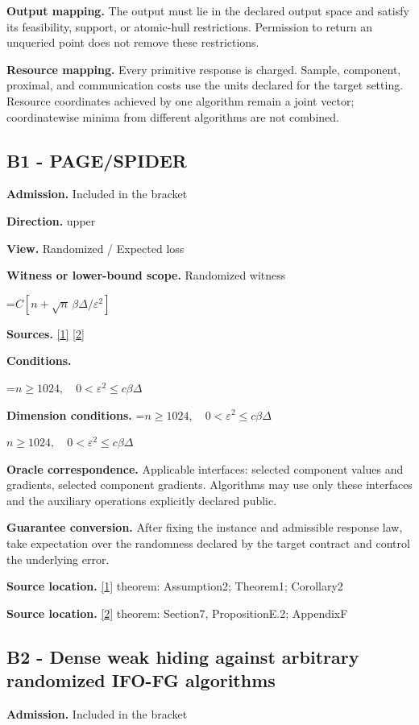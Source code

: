 \documentclass[10pt,a4paper]{article}
\newcommand{\AtlasMath}[1]{\par\begingroup\centering\setbox0=\hbox{$\displaystyle #1$}\ifdim\wd0>1.4\linewidth\typeout{ATLAS WIDE FORMULA: \the\wd0}\fi\ifdim\wd0>\linewidth\resizebox{\linewidth}{!}{\box0}\else\box0\fi\par\endgroup}
\newcommand{\AtlasInlineMath}[1]{\begingroup\setbox0=\hbox{$#1$}\ifdim\wd0>.4\linewidth\endgroup\AtlasMath{#1}\else\endgroup$#1$\fi}
\begin{document}
\textbf{Output mapping.} The output must lie in the declared output space and satisfy its feasibility, support, or atomic-hull restrictions. Permission to return an unqueried point does not remove these restrictions.

\textbf{Resource mapping.} Every primitive response is charged. Sample, component, proximal, and communication costs use the units declared for the target setting. Resource coordinates achieved by one algorithm remain a joint vector; coordinatewise minima from different algorithms are not combined.

\subsection{B1 - PAGE/SPIDER}
\textbf{Admission.} Included in the bracket

\textbf{Direction.} upper

\textbf{View.} Randomized / Expected loss

\textbf{Witness or lower-bound scope.} Randomized witness

\AtlasMath{C[n+\sqrt n\,\beta\Delta/\varepsilon^2]}
\textbf{Sources.} \href{https://proceedings.mlr.press/v139/li21a/li21a.pdf}{[1]} \href{https://arxiv.org/pdf/2609.00045v3}{[2]}

\textbf{Conditions.} 
\AtlasMath{n\ge1024,\quad0<\varepsilon^2\le c\beta\Delta}


\textbf{Dimension conditions.} \AtlasInlineMath{n\ge1024,\quad0<\varepsilon^2\le c\beta\Delta}

\textbf{Oracle correspondence.} Applicable interfaces: selected component values and gradients, selected component gradients. Algorithms may use only these interfaces and the auxiliary operations explicitly declared public.

\textbf{Guarantee conversion.} After fixing the instance and admissible response law, take expectation over the randomness declared by the target contract and control the underlying error.

\textbf{Source location.} \href{https://proceedings.mlr.press/v139/li21a/li21a.pdf}{[1]} theorem: Assumption2; Theorem1; Corollary2

\textbf{Source location.} \href{https://arxiv.org/pdf/2609.00045v3}{[2]} theorem: Section7, PropositionE.2; AppendixF

\subsection{B2 - Dense weak hiding against arbitrary randomized IFO-FG algorithms}
\textbf{Admission.} Included in the bracket
\end{document}
